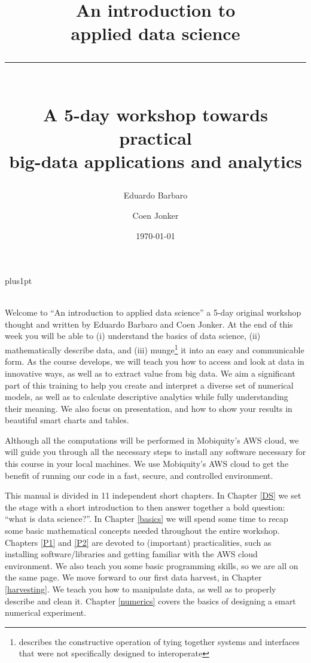 \documentclass[10pt]{PhDthesisPSnPDF}%
\title{\Huge{An introduction to \\ applied data science} \\ 
\rule{100mm}{5pt} \\
\Large{A 5-day workshop towards practical \\ big-data applications and analytics}}
\author{\Large{Eduardo Barbaro}}
\author{\Large{Coen Jonker}}
\affil{\normalsize Data Scientistists at Mobiquity Inc}
\date{\today}
\begin{document}
\renewcommand\baselinestretch{1}
\baselineskip=14pt plus1pt

\maketitle


 \\

Welcome to ``An introduction to applied data science'' a 5-day original workshop thought and written by Eduardo Barbaro and Coen Jonker. At the end of this week you will be able to (i) understand the basics of data science, (ii) mathematically describe data, and (iii) munge\footnote{describes the constructive operation of tying together systems and interfaces that were not specifically designed to interoperate} it into an easy and communicable form. As the course develops, we will teach you how to access and look at data in innovative ways, as well as to extract value from big data. We aim a significant part of this training to help you create and interpret a diverse set of numerical models, as well as to calculate descriptive analytics while fully understanding their meaning. We also focus on presentation, and how to show your results in beautiful smart charts and tables.

Although all the computations will be performed in Mobiquity's AWS cloud, we will guide you through all the necessary steps to install any software necessary for this course in your local machines. We use Mobiquity's AWS cloud to get the benefit of running our code in a fast, secure, and controlled environment.

This manual is divided in 11 independent short chapters. In Chapter \ref{DS} we set the stage with a short introduction to then answer together a bold question: ``what is data science?''. In Chapter \ref{basics} we will spend some time to recap some basic mathematical concepts needed throughout the entire workshop. Chapters \ref{P1} and \ref{P2} are devoted to (important) practicalities, such as installing software/libraries and getting familiar with the AWS cloud environment. We also teach you some basic programming skills, so we are all on the same page. We move forward to our first data harvest, in Chapter \ref{harvesting}. We teach you how to manipulate data, as well as to properly describe and clean it. Chapter \ref{numerics} covers the basics of designing a smart numerical experiment. 
\end{document}
